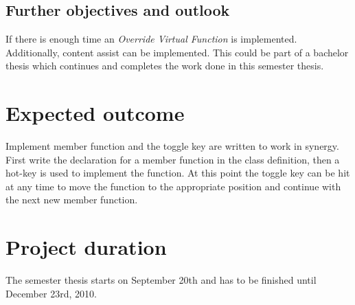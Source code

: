 \subsection{Further objectives and outlook}

If there is enough time an \textit{Override Virtual Function} is implemented.
Additionally, content assist can be implemented. This could be part of a
bachelor thesis which continues and completes the work done in this semester
thesis.

\section{Expected outcome}

Implement member function and the toggle key are written to work in synergy.
First write the declaration for a member function in the class definition, then
a hot-key is used to implement the function. At this point the toggle key can
be hit at any time to move the function to the appropriate position and
continue with the next new member function.

\section{Project duration}
The semester thesis starts on September 20th and has to be finished until
December 23rd, 2010.

